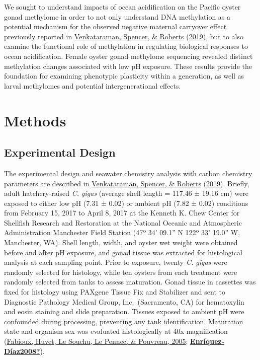 \documentclass [11pt, proquest] {uwthesis}[2015/03/03]
\begin{document}
We sought to understand impacts of ocean acidification on the Pacific oyster gonad methylome in order to not only understand DNA methylation as a potential mechanism for the observed negative maternal carryover effect previously reported in \protect\hyperlink{ref-Venkataraman2019}{Venkataraman, Spencer, \& Roberts} (\protect\hyperlink{ref-Venkataraman2019}{2019}), but to also examine the functional role of methylation in regulating biological responses to ocean acidification. Female oyster gonad methylome sequencing revealed distinct methylation changes associated with low pH exposure. These results provide the foundation for examining phenotypic plasticity within a generation, as well as larval methylomes and potential intergenerational effects.

\hypertarget{methods-2}{%
\section{Methods}\label{methods-2}}

\hypertarget{experimental-design}{%
\subsection{Experimental Design}\label{experimental-design}}

The experimental design and seawater chemistry analysis with carbon chemistry parameters are described in \protect\hyperlink{ref-Venkataraman2019}{Venkataraman, Spencer, \& Roberts} (\protect\hyperlink{ref-Venkataraman2019}{2019}). Briefly, adult hatchery-raised \emph{C. gigas} (average shell length = 117.46 ± 19.16 cm) were exposed to either low pH (7.31 ± 0.02) or ambient pH (7.82 ± 0.02) conditions from February 15, 2017 to April 8, 2017 at the Kenneth K. Chew Center for Shellfish Research and Restoration at the National Oceanic and Atmospheric Administration Manchester Field Station (47º 34' 09.1'' N 122º 33' 19.0'' W, Manchester, WA). Shell length, width, and oyster wet weight were obtained before and after pH exposure, and gonad tissue was extracted for histological analysis at each sampling point. Prior to exposure, twenty \emph{C. gigas} were randomly selected for histology, while ten oysters from each treatment were randomly selected from tanks to assess maturation. Gonad tissue in cassettes was fixed for histology using PAXgene Tissue Fix and Stabilizer and sent to Diagnostic Pathology Medical Group, Inc.~(Sacramento, CA) for hematoxylin and eosin staining and slide preparation. Tissues exposed to ambient pH were confounded during processing, preventing any tank identification. Maturation state and organism sex was evaluated histologically at 40x magnification (\protect\hyperlink{ref-Fabioux2005}{Fabioux, Huvet, Le Souchu, Le Pennec, \& Pouvreau, 2005}; \protect\hyperlink{ref-Enruxedquez-Duxedaz2008}{\textbf{Enríquez-Díaz2008?}}).
\end{document}
